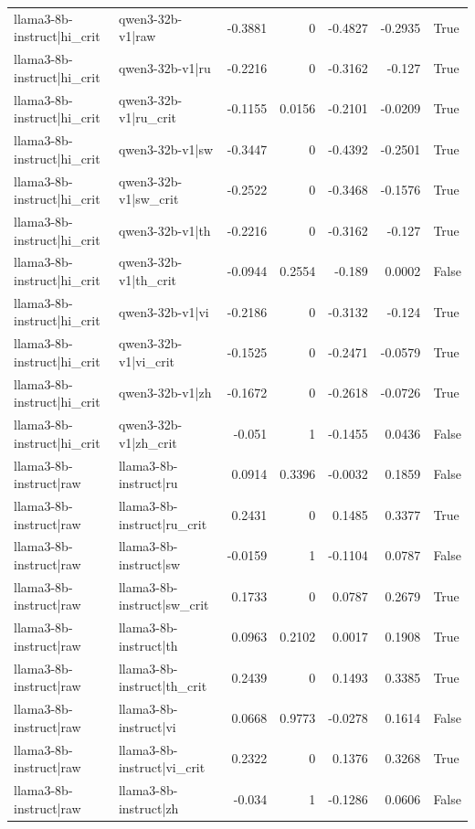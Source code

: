 \begin{table}
\begin{tabular}{l l r r r r l}
llama3-8b-instruct|hi_crit & qwen3-32b-v1|raw & -0.3881 & 0 & -0.4827 & -0.2935 & True \\
llama3-8b-instruct|hi_crit & qwen3-32b-v1|ru & -0.2216 & 0 & -0.3162 & -0.127 & True \\
llama3-8b-instruct|hi_crit & qwen3-32b-v1|ru_crit & -0.1155 & 0.0156 & -0.2101 & -0.0209 & True \\
llama3-8b-instruct|hi_crit & qwen3-32b-v1|sw & -0.3447 & 0 & -0.4392 & -0.2501 & True \\
llama3-8b-instruct|hi_crit & qwen3-32b-v1|sw_crit & -0.2522 & 0 & -0.3468 & -0.1576 & True \\
llama3-8b-instruct|hi_crit & qwen3-32b-v1|th & -0.2216 & 0 & -0.3162 & -0.127 & True \\
llama3-8b-instruct|hi_crit & qwen3-32b-v1|th_crit & -0.0944 & 0.2554 & -0.189 & 0.0002 & False \\
llama3-8b-instruct|hi_crit & qwen3-32b-v1|vi & -0.2186 & 0 & -0.3132 & -0.124 & True \\
llama3-8b-instruct|hi_crit & qwen3-32b-v1|vi_crit & -0.1525 & 0 & -0.2471 & -0.0579 & True \\
llama3-8b-instruct|hi_crit & qwen3-32b-v1|zh & -0.1672 & 0 & -0.2618 & -0.0726 & True \\
llama3-8b-instruct|hi_crit & qwen3-32b-v1|zh_crit & -0.051 & 1 & -0.1455 & 0.0436 & False \\
llama3-8b-instruct|raw & llama3-8b-instruct|ru & 0.0914 & 0.3396 & -0.0032 & 0.1859 & False \\
llama3-8b-instruct|raw & llama3-8b-instruct|ru_crit & 0.2431 & 0 & 0.1485 & 0.3377 & True \\
llama3-8b-instruct|raw & llama3-8b-instruct|sw & -0.0159 & 1 & -0.1104 & 0.0787 & False \\
llama3-8b-instruct|raw & llama3-8b-instruct|sw_crit & 0.1733 & 0 & 0.0787 & 0.2679 & True \\
llama3-8b-instruct|raw & llama3-8b-instruct|th & 0.0963 & 0.2102 & 0.0017 & 0.1908 & True \\
llama3-8b-instruct|raw & llama3-8b-instruct|th_crit & 0.2439 & 0 & 0.1493 & 0.3385 & True \\
llama3-8b-instruct|raw & llama3-8b-instruct|vi & 0.0668 & 0.9773 & -0.0278 & 0.1614 & False \\
llama3-8b-instruct|raw & llama3-8b-instruct|vi_crit & 0.2322 & 0 & 0.1376 & 0.3268 & True \\
llama3-8b-instruct|raw & llama3-8b-instruct|zh & -0.034 & 1 & -0.1286 & 0.0606 & False \\

\end{tabular}
\end{table}
